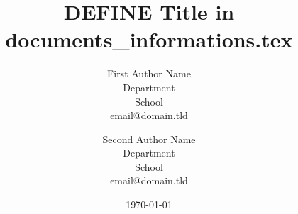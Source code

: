 \title{DEFINE Title in documents\_informations.tex}

\author{
    First Author Name \\
    Department \\
    School \\
    email@domain.tld \\

  \and
    Second Author Name \\
    Department \\
    School \\
    email@domain.tld \\


}

\date{\today}
\newcommand{\dateOfApplication}{\date{\today}}

\newcommand{\keywords}{Keyword1, Keyword2, Keyword3}


\newcommand{\examinerOne}{
  First Examiner Name \\
  Department \\
  School
}

\newcommand{\examinerTwo}{
  Second Examiner Name \\
  Department \\
  School
}

\newcommand{\typeOfThesis}{Bachelorthesis}
\newcommand{\faculty}{Communication and Environment}
\newcommand{\studyprogram}{Communication and Information Engineering}
\newcommand{\town}{Kamp-Lintfort}
